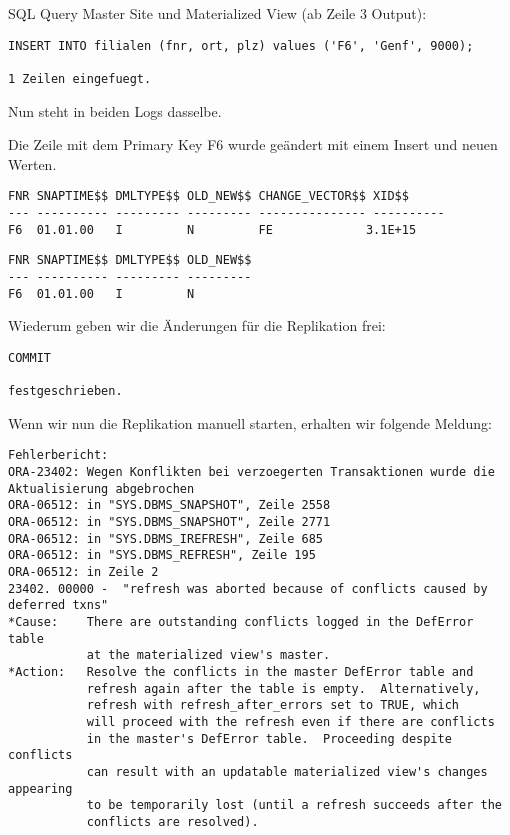 \documentclass[11pt,a4paper,parskip=half]{scrartcl}
\begin{document}
SQL Query Master Site und Materialized View (ab Zeile 3 Output):
\begin{lstlisting}
INSERT INTO filialen (fnr, ort, plz) values ('F6', 'Genf', 9000);

1 Zeilen eingefuegt.
\end{lstlisting}

Nun steht in beiden Logs dasselbe.

Die Zeile mit dem Primary Key F6 wurde geändert mit einem Insert und neuen Werten.
\begin{lstlisting}
FNR SNAPTIME$$ DMLTYPE$$ OLD_NEW$$ CHANGE_VECTOR$$ XID$$
--- ---------- --------- --------- --------------- ----------
F6  01.01.00   I         N         FE             3.1E+15
\end{lstlisting}
\begin{lstlisting}
FNR SNAPTIME$$ DMLTYPE$$ OLD_NEW$$
--- ---------- --------- ---------
F6  01.01.00   I         N         
\end{lstlisting}

Wiederum geben wir die Änderungen für die Replikation frei:
\begin{lstlisting}
COMMIT

festgeschrieben.
\end{lstlisting}

Wenn wir nun die Replikation manuell starten, erhalten wir folgende Meldung:
\begin{lstlisting}
Fehlerbericht:
ORA-23402: Wegen Konflikten bei verzoegerten Transaktionen wurde die Aktualisierung abgebrochen
ORA-06512: in "SYS.DBMS_SNAPSHOT", Zeile 2558
ORA-06512: in "SYS.DBMS_SNAPSHOT", Zeile 2771
ORA-06512: in "SYS.DBMS_IREFRESH", Zeile 685
ORA-06512: in "SYS.DBMS_REFRESH", Zeile 195
ORA-06512: in Zeile 2
23402. 00000 -  "refresh was aborted because of conflicts caused by deferred txns"
*Cause:    There are outstanding conflicts logged in the DefError table
           at the materialized view's master.
*Action:   Resolve the conflicts in the master DefError table and
           refresh again after the table is empty.  Alternatively,
           refresh with refresh_after_errors set to TRUE, which
           will proceed with the refresh even if there are conflicts
           in the master's DefError table.  Proceeding despite conflicts
           can result with an updatable materialized view's changes appearing
           to be temporarily lost (until a refresh succeeds after the
           conflicts are resolved).
\end{lstlisting}
\end{document}
